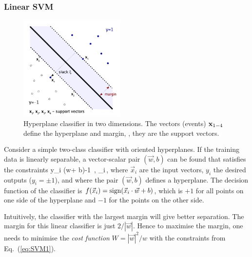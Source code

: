 \subsubsection*{Linear SVM}

%
\begin{figure}[t]
\centering
	  \includegraphics[width=0.47\textwidth]{plots/SVM}
\caption{ Hyperplane classifier in two dimensions. The vectors (events) ${\bf x}_{1-4}$          
          define the hyperplane and margin, \ie, they are the support vectors.
}
\label{fig:classifier}
\end{figure}
Consider a simple two-class classifier  with oriented hyperplanes.  If the training 
data is linearly separable, a vector-scalar pair $(\vec w, b)$ can be found that 
satisfies the constraints
%
\beq
   \label{eq:SVM1}
   y_i (\cdot \vec w+ b)-1 \,, \space \mbox{\hspace{0.5cm}} \forall_i\,,
\eeq
%
where $\vec x_i$ are the input vectors, $y_i$ the desired outputs ($y_i=\pm 1$),  
and where the pair $(\vec w,b)$ defines a hyperplane. The decision function of 
the classifier is  
$f(\vec x_i)= {\rm sign} (\vec x_i\cdot \vec w+ b)$, which is $+1$ for all points on   
one side of the hyperplane and $-1$ for the points on the other side. 

Intuitively, the classifier with the largest margin will give better separation.
The margin for this linear classifier is just $2/|\vec w|$.  Hence to maximise the 
margin, one needs to minimise the {\em cost function} $W = |\vec w|^2/w$ with the 
constraints from Eq.~(\ref{eq:SVM1}). 

